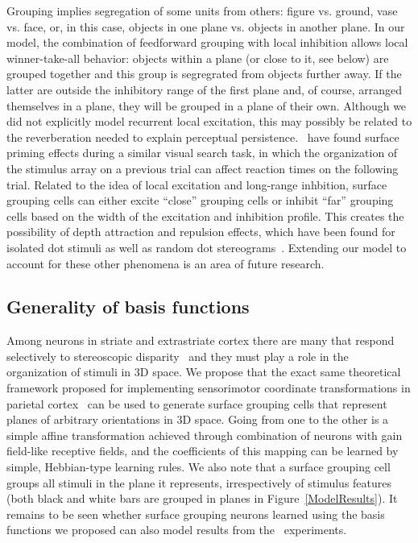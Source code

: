 Grouping implies segregation of some units from others: figure vs. ground, vase vs. face, or, in this case, objects in one plane vs. objects in another plane. In our model, the combination of feedforward grouping with local inhibition allows local winner-take-all behavior: objects within a plane (or close to it, see below) are grouped together and this group is segregrated from objects further away. If the latter are outside the inhibitory range of the first plane and, of course, arranged themselves in a plane, they will be grouped in a plane of their own. Although we did not explicitly model recurrent local excitation, this may possibly be related to the reverberation needed to explain perceptual persistence.~\citet{McCarley_He01} have found surface priming effects during a similar visual search task, in which the organization of the stimulus array on a previous trial can affect reaction times on the following trial. Related to the idea of local excitation and long-range inhbition, surface grouping cells can either excite “close” grouping cells or inhibit “far” grouping cells based on the width of the excitation and inhibition profile. This creates the possibility of depth attraction and repulsion effects, which have been found for isolated dot stimuli as well as random dot stereograms~\citep{Stevenson_etal91}. Extending our model to account for these other phenomena is an area of future research.

\subsection{Generality of basis functions}

Among neurons in striate and extrastriate cortex there are many that respond selectively to stereoscopic disparity~\citep{Poggio_Fischer77,Cumming_DeAngelis01} and they must play a role in the organization of stimuli in 3D space. We propose that the exact same theoretical framework proposed for implementing sensorimotor coordinate transformations in parietal cortex~\citep{Salinas_Abbott95,Pouget_Sejnowski97b} can be used to generate surface grouping cells that represent planes of arbitrary orientations in 3D space. Going from one to the other is a simple affine transformation achieved through combination of neurons with gain field-like receptive fields, and the coefficients of this mapping can be learned by simple, Hebbian-type learning rules. We also note that a surface grouping cell groups all stimuli in the plane it represents, irrespectively of stimulus features (both black and white bars are grouped in planes in Figure~\ref{ModelResults}). It remains to be seen whether surface grouping neurons learned using the basis functions we proposed can also model results from the~\citet{He_Nakayama95} experiments.

